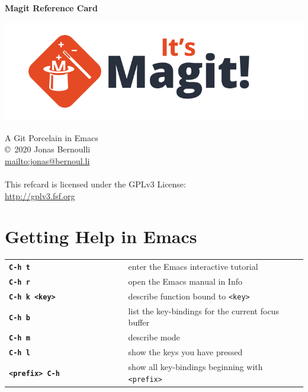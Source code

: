 \documentclass[9pt]{extarticle} %
\renewcommand{\title}[1]
{{\normalfont\sffamily\huge\bfseries #1}\vspace{1ex}}
\begin{document}
\begin{multicols}{3}

  \title{Magit Reference Card}

  \begin{center}
    \includegraphics[scale=0.25]{magit.png}
  \end{center}

  {\small
    A Git Porcelain in Emacs \\
    \copyright\ 2020 Jonas Bernoulli \hspace{1em} \\
    \url{mailto:jonas@bernoul.li} \\ \\
    This refcard is licensed under the GPLv3 License: \\
    \href{http://gplv3.fsf.org/}{http://gplv3.fsf.org}
  }

  \vspace{3ex}

  \section*{Getting Help in Emacs}

  \renewcommand{\arraystretch}{1.3}
  \begin{tabular}{L{0.40\linewidth} L{0.60\linewidth}}
    \tt \textbf{C-h t}
    & enter the Emacs interactive tutorial \\
    \tt \textbf{C-h r}
    & open the Emacs manual in Info \\
    \tt \textbf{C-h k <key>}
    & describe function bound to \texttt{<key>}  \\
    \tt \textbf{C-h b}
    & list the key-bindings for the current focus buffer \\
    \tt \textbf{C-h m}
    & describe mode \\
    \tt \textbf{C-h l}
    & show the keys you have pressed \\
    \tt \textbf{<prefix> C-h}
    & show all key-bindings beginning with \texttt{<prefix>}
  \end{tabular}


\end{multicols}
\end{document}
